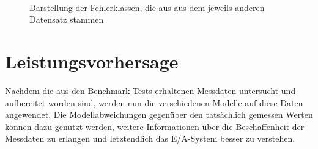 \documentclass[
	12pt,
	a4paper,
	BCOR10mm,
	DIV14,
	listof=totoc,
	bibliography=totoc,
	headsepline
]{scrreprt}
\begin{document}
\begin{figure}
	\centering
	\hfill
	\\
	\hfill
	\caption{Darstellung der Fehlerklassen, die aus aus dem jeweils anderen Datensatz stammen}
	\label{fig:error_classes_switched}
\end{figure} 
\clearpage

\section{Leistungsvorhersage}
\label{eval:leistungsvorhersage}
Nachdem die aus den Benchmark-Tests erhaltenen Messdaten untersucht und aufbereitet worden sind, werden nun die verschiedenen Modelle auf diese Daten angewendet.
Die Modellabweichungen gegenüber den tatsächlich gemessen Werten können dazu genutzt werden, weitere Informationen über die Beschaffenheit der Messdaten zu erlangen und letztendlich das E/A-System besser zu verstehen.\medskip
\end{document}
